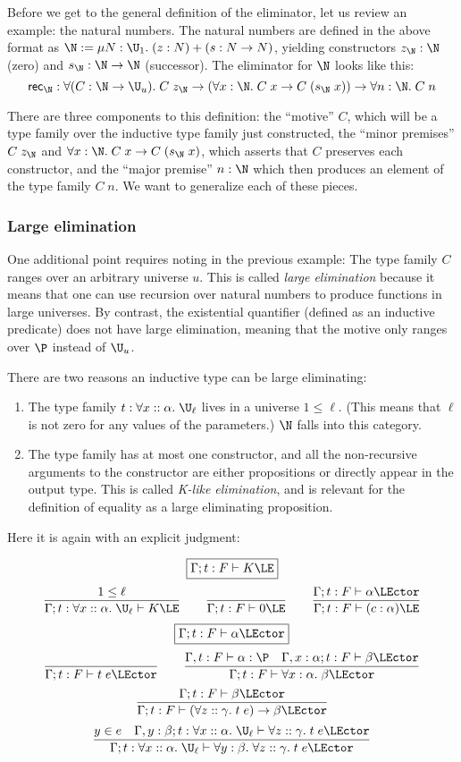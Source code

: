 Before we get to the general definition of the eliminator, let us review an example: the natural numbers. The natural numbers are defined in the above format as $\N:=\mu N:\U_1.\;(z:N)+(s:N\to N)$, yielding constructors $z_\N:\N$ (zero) and $s_\N:\N\to\N$ (successor). The eliminator for $\N$ looks like this:
$$\mathsf{rec}_\N:\forall (C:\N\to \U_u).\;C\;z_\N\to(\forall x:\N.\;C\;x\to C\;(s_\N\;x))\to\forall n:\N.\;C\;n$$

There are three components to this definition: the ``motive'' $C$, which will be a type family over the inductive type family just constructed, the ``minor premises'' $C\;z_\N$ and $\forall x:\N.\;C\;x\to C\;(s_\N\;x)$, which asserts that $C$ preserves each constructor, and the ``major premise'' $n:\N$ which then produces an element of the type family $C\;n$. We want to generalize each of these pieces.

\subsubsection{Large elimination}\label{sec:large_elim}
One additional point requires noting in the previous example: The type family $C$ ranges over an arbitrary universe $u$. This is called \emph{large elimination} because it means that one can use recursion over natural numbers to produce functions in large universes. By contrast, the existential quantifier (defined as an inductive predicate) does not have large elimination, meaning that the motive only ranges over $\P$ instead of $\U_u$.

There are two reasons an inductive type can be large eliminating:

\begin{enumerate}
\item The type family $t:\forall x::\alpha.\;\U_\ell$ lives in a universe $1\le\ell$. (This means that $\ell$ is not zero for any values of the parameters.) $\N$ falls into this category.
\item The type family has at most one constructor, and all the non-recursive arguments to the constructor are either propositions or directly appear in the output type. This is called \emph{K-like elimination}, and is relevant for the definition of equality as a large eliminating proposition.
\end{enumerate}

Here it is again with an explicit judgment:

$$\boxed{\Gamma;t:F\vdash K\LE}$$
$$\frac{1\le\ell}{\Gamma;t:\forall x::\alpha.\;\U_\ell\vdash K\LE}\qquad
\frac{}{\Gamma;t:F\vdash 0\LE}\qquad
\frac{\Gamma;t:F\vdash \alpha\LEctor}{\Gamma;t:F\vdash (c:\alpha)\LE}$$
$$\boxed{\Gamma;t:F\vdash \alpha\LEctor}$$
$$\frac{}{\Gamma;t:F\vdash t\;e\LEctor}\qquad
\frac{\Gamma,t:F\vdash \alpha:\P\quad \Gamma,x:\alpha;t:F\vdash\beta\LEctor}{\Gamma;t:F\vdash\forall x:\alpha.\;\beta\LEctor}$$
$$\frac{\Gamma;t:F\vdash\beta\LEctor}{\Gamma;t:F\vdash(\forall z::\gamma.\;t\;e)\to\beta\LEctor}$$
$$\frac{y\in e\quad \Gamma,y:\beta;t:\forall x::\alpha.\;\U_\ell\vdash\forall z::\gamma.\; t\;e\LEctor}{\Gamma;t:\forall x::\alpha.\;\U_\ell\vdash\forall y:\beta.\;\forall z::\gamma.\;t\;e\LEctor}$$

